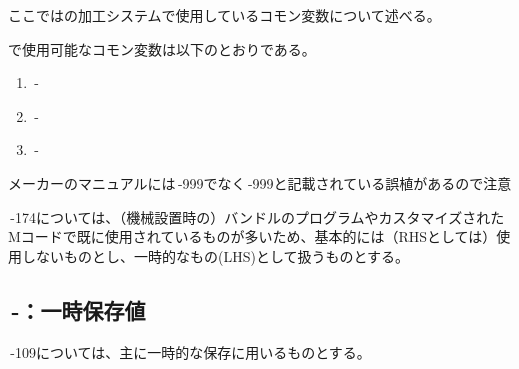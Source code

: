 


ここでは\DMname の加工システムで使用しているコモン変数について述べる。


\DMname で使用可能なコモン変数は以下のとおりである。
\begin{enumerate}
\item {}\,-
\item {}\,-
\item {}\,-
\end{enumerate}
\begin{marker}
メーカーのマニュアルには\,-\ttNum999でなく\,-\ttNum999と記載されている誤植があるので注意
\end{marker}



\,-\ttNum174については、（機械設置時の）バンドルのプログラムやカスタマイズされたMコードで既に使用されているものが多いため、基本的には（RHSとしては）使用しないものとし、一時的なもの(LHS)として扱うものとする。


\subsection{\,-：一時保存値}
\noindent{}\,-\ttNum109については、主に一時的な保存に用いるものとする。\\

